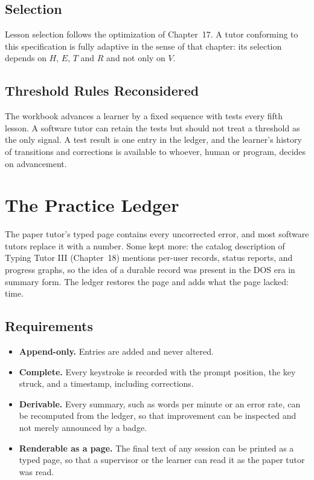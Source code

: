 \section{Selection}

Lesson selection follows the optimization of Chapter~17. A tutor conforming to this specification is fully adaptive in the sense of that chapter: its selection depends on $H$, $E$, $T$ and $R$ and not only on $V$.

\section{Threshold Rules Reconsidered}

The workbook advances a learner by a fixed sequence with tests every fifth lesson. A software tutor can retain the tests but should not treat a threshold as the only signal. A test result is one entry in the ledger, and the learner's history of transitions and corrections is available to whoever, human or program, decides on advancement.

\chapter{The Practice Ledger}

The paper tutor's typed page contains every uncorrected error, and most software tutors replace it with a number. Some kept more: the catalog description of Typing Tutor III (Chapter~18) mentions per-user records, status reports, and progress graphs, so the idea of a durable record was present in the DOS era in summary form. The ledger restores the page and adds what the page lacked: time.

\section{Requirements}

\begin{itemize}
\item \textbf{Append-only.} Entries are added and never altered.
\item \textbf{Complete.} Every keystroke is recorded with the prompt position, the key struck, and a timestamp, including corrections.
\item \textbf{Derivable.} Every summary, such as words per minute or an error rate, can be recomputed from the ledger, so that improvement can be inspected and not merely announced by a badge.
\item \textbf{Renderable as a page.} The final text of any session can be printed as a typed page, so that a supervisor or the learner can read it as the paper tutor was read.
\end{itemize}

